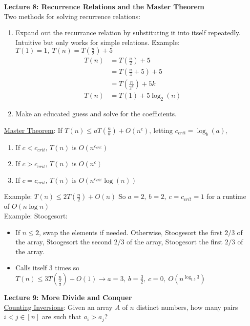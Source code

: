 \documentclass{article}
\begin{document}
\textbf{Lecture 8: Recurrence Relations and the Master Theorem} \\[1.0ex]
Two methods for solving recurrence relations: 
\begin{enumerate}
    \item Expand out the recurrance relation by substituting it into itself repeatedly. Intuitive but only works for simple relations. Example: $T(1) = 1,\ T(n) = T(\frac{n}{2}) + 5$
    \begin{align}
        T(n) &= T(\frac{n}{2}) + 5 \\ 
            &=T(\frac{n}{4} + 5) + 5 \\
            &= T(\frac{n}{2^k}) + 5k \\
        T(n) &= T(1) + 5 \log_2(n)
    \end{align}
    \item Make an educated guess and solve for the coefficients. 
\end{enumerate}
\underline{Master Theorem}: If $T(n) \leq a T (\frac{n}{b}) + O(n^c)$, letting $c_{crit} = \log_b(a)$, 
\begin{enumerate}
    \item If $c < c_{crit}$, $T(n)$ is $O(n^{c_{crit}})$
    \item If $c > c_{crit}$, $T(n)$ is $O(n^{c})$
    \item If $c = c_{crit}$, $T(n)$ is $O(n^{c_{crit}} \log (n))$
\end{enumerate}
Example: $T(n) \leq 2T(\frac{n}{2}) + O(n)$ So $a = 2,\ b = 2,\ c = c_{crit} = 1$ for a runtime of $O(n \log n)$ \\[0.75ex]
Example: Stoogesort: 
\begin{itemize}
    \item If $n \leq 2$, swap the elements if needed. Otherwise, Stoogesort the first $2/3$ of the array, Stoogesort the second $2/3$ of the array, Stoogesort the first $2/3$ of the array.
    \item Calls itself 3 times so $T(n) \leq 3T(\frac{n}{\frac{3}{2}}) + O(1) \rightarrow a = 3,\ b = \frac{3}{2},\ c = 0,\ O(n^{\log_{1.5}3})$
\end{itemize}
\textbf{Lecture 9: More Divide and Conquer} \\[1.0ex]
\underline{Counting Inversions}: Given an array $A$ of $n$ distinct numbers, how many pairs $i < j \in [n]$ are such that $a_i > a_j$?
\end{document}
